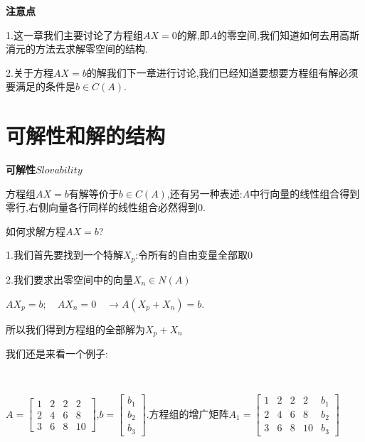 \documentclass[oneside]{book}
\begin{document}
\textbf{注意点}

1.这一章我们主要讨论了方程组$AX=0$的解,即$A$的零空间,我们知道如何去用高斯消元的方法去求解零空间的结构.

2.关于方程$AX=b$的解我们下一章进行讨论,我们已经知道要想要方程组有解必须要满足的条件是$b\in C(A)$.
	\chapter{可解性和解的结构}
	\textbf{可解性}\quad $Slovability$
	
	方程组$AX=b$有解等价于$b \in C(A)$,还有另一种表述:$A$中行向量的线性组合得到零行,右侧向量各行同样的线性组合必然得到0.
	
	如何求解方程$AX=b$?
	
	1.我们首先要找到一个特解$X_{p}$:令所有的自由变量全部取0
	
	2.我们要求出零空间中的向量$X_{n}\in N(A)$
	
	$AX_{p}=b;\quad AX_{n}=0 \quad \rightarrow A(X_{p}+X_{n})=b$.
	
	所以我们得到方程组的全部解为$X_{p}+X_{n}$
	
	我们还是来看一个例子:
	
	\hspace{\fill}\
	
	$A=\left[\begin{array}{cccc}
		1&2&2&2\\2&4&6&8\\3&6&8&10      
	\end{array}\right]$,$b=\left[\begin{array}{c}
		b_{1}\\b_{2}\\b_{3}\end{array}\right]$.方程组的增广矩阵$A_{1}=\left[\begin{array}{ccccc}
		1&2&2&2&b_{1}\\2&4&6&8&b_{2}\\3&6&8&10&b_{3}
	\end{array}\right]$
\end{document}
